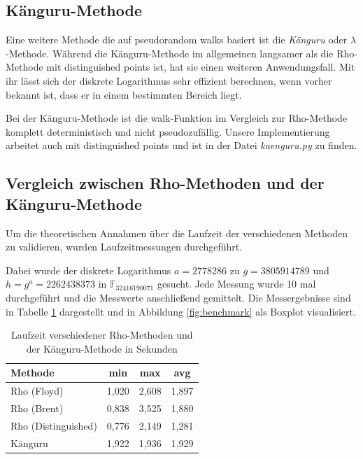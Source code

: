 \documentclass{scrartcl}
\begin{document}
\subsection{Känguru-Methode}
\label{sec:kaenguru}
Eine weitere Methode die auf pseudorandom walks basiert ist die
\emph{Känguru} oder \(\lambda\)-Methode.
Während die Känguru-Methode im allgemeinen langsamer als die Rho-Methode
 mit distinguished points ist, hat sie einen weiteren Anwendungsfall.
Mit ihr lässt sich der diskrete Logarithmus sehr effizient berechnen,
wenn vorher bekannt ist, dass er in einem bestimmten Bereich liegt.

Bei der Känguru-Methode ist die walk-Funktion im Vergleich zur Rho-Methode
komplett deterministisch und nicht pseudozufällig.
Unsere Implementierung arbeitet auch mit distinguished points und ist in
der Datei \emph{kaenguru.py} zu finden.
\cite{Galbraith2012}

\subsection{Vergleich zwischen Rho-Methoden und der Känguru-Methode}
Um die theoretischen Annahmen über die Laufzeit der verschiedenen Methoden
zu validieren, wurden Laufzeitmessungen durchgeführt.

Dabei wurde der diskrete Logarithmus \( a = 2778286 \) zu \( g = 3805914789 \)
und \(h = g^a = 2262438373 \) in \( \mathbb{F}_{32416190071} \) gesucht.
Jede Messung wurde 10 mal durchgeführt und die Messwerte anschließend gemittelt.
Die Messergebnisse sind in Tabelle \ref{tab:benchmark} dargestellt und
in Abbildung \ref{fig:benchmark} als Boxplot visualisiert.

\begin{table}[h]
  \centering
  \begin{tabular}{l|c|c|c}
    Methode             & min   & max   & avg   \\ \hline
    Rho (Floyd)         & 1,020 & 2,608 & 1,897  \\ \hline
    Rho (Brent)         & 0,838 & 3,525 & 1,880 \\ \hline
    Rho (Distinguished) & 0,776 & 2,149 & 1,281 \\ \hline
    Känguru             & 1,922 & 1,936 & 1,929
    \end{tabular}
  \caption{Laufzeit verschiedener Rho-Methoden und der Känguru-Methode in Sekunden}
  \label{tab:benchmark}
\end{table}
\end{document}
